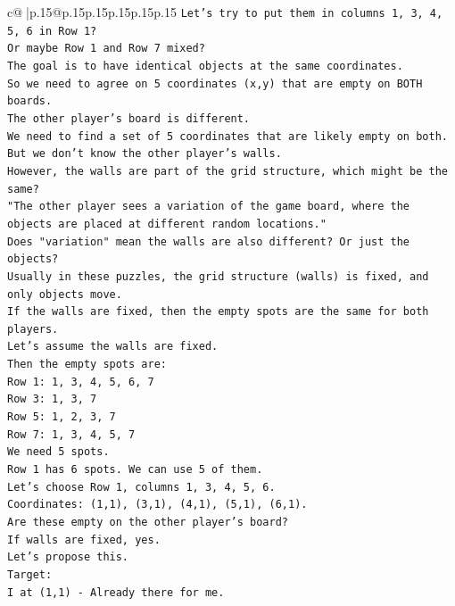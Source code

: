 \documentclass{article}
\begin{document}
{\begin{supertabular}{c@{$\;$}|p{.15\linewidth}@{}p{.15\linewidth}p{.15\linewidth}p{.15\linewidth}p{.15\linewidth}p{.15\linewidth}}
{{{\texttt{Let's try to put them in columns 1, 3, 4, 5, 6 in Row 1?} \\
\texttt{Or maybe Row 1 and Row 7 mixed?} \\
\texttt{The goal is to have identical objects at the same coordinates.} \\
\texttt{So we need to agree on 5 coordinates (x,y) that are empty on BOTH boards.} \\
\texttt{The other player's board is different.} \\
\texttt{We need to find a set of 5 coordinates that are likely empty on both.} \\
\texttt{But we don't know the other player's walls.} \\
\texttt{However, the walls are part of the grid structure, which might be the same?} \\
\texttt{"The other player sees a variation of the game board, where the objects are placed at different random locations."} \\
\texttt{Does "variation" mean the walls are also different? Or just the objects?} \\
\texttt{Usually in these puzzles, the grid structure (walls) is fixed, and only objects move.} \\
\texttt{If the walls are fixed, then the empty spots are the same for both players.} \\
\texttt{Let's assume the walls are fixed.} \\
\texttt{Then the empty spots are:} \\
\texttt{Row 1: 1, 3, 4, 5, 6, 7} \\
\texttt{Row 3: 1, 3, 7} \\
\texttt{Row 5: 1, 2, 3, 7} \\
\texttt{Row 7: 1, 3, 4, 5, 7} \\
\texttt{We need 5 spots.} \\
\texttt{Row 1 has 6 spots. We can use 5 of them.} \\
\texttt{Let's choose Row 1, columns 1, 3, 4, 5, 6.} \\
\texttt{Coordinates: (1,1), (3,1), (4,1), (5,1), (6,1).} \\
\texttt{Are these empty on the other player's board?} \\
\texttt{If walls are fixed, yes.} \\
\texttt{Let's propose this.} \\
\texttt{Target:} \\
\texttt{I at (1,1) {-} Already there for me.} \\
}}}
\end{supertabular}}
\end{document}
